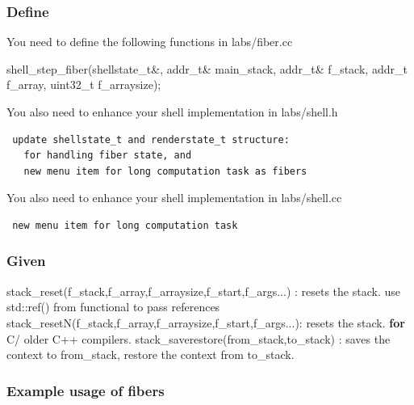 \documentclass[]{book}
\newenvironment{Shaded}{}{}
\newcommand{\KeywordTok}[1]{\textbf{{#1}}}
\newcommand{\DataTypeTok}[1]{\textcolor[rgb]{0.50,0.00,0.00}{{#1}}}
\newcommand{\NormalTok}[1]{{#1}}
\begin{document}
\subsubsection*{Define}\label{define-5}

You need to define the following functions in labs/fiber.cc

\begin{Shaded}
\begin{Highlighting}[]
   \NormalTok{shell_step_fiber(shellstate_t&, addr_t& main_stack, addr_t& f_stack, addr_t f_array, }\DataTypeTok{uint32_t} \NormalTok{f_arraysize);}
\end{Highlighting}
\end{Shaded}

You also need to enhance your shell implementation in labs/shell.h

\begin{verbatim}
 update shellstate_t and renderstate_t structure:
   for handling fiber state, and
   new menu item for long computation task as fibers
\end{verbatim}

You also need to enhance your shell implementation in labs/shell.cc

\begin{verbatim}
 new menu item for long computation task
\end{verbatim}

\subsubsection*{Given}\label{given-5}

\begin{Shaded}
\begin{Highlighting}[]
        \NormalTok{stack_reset(f_stack,f_array,f_arraysize,f_start,f_args...) : resets the stack. use std::ref() from functional to pass references}
        \NormalTok{stack_resetN(f_stack,f_array,f_arraysize,f_start,f_args...): resets the stack. }\KeywordTok{for} \NormalTok{C/ older C++ compilers.}
        \NormalTok{stack_saverestore(from_stack,to_stack)                     : saves the context to from_stack, restore the context from to_stack.}
\end{Highlighting}
\end{Shaded}

\subsubsection*{Example usage of fibers}\label{example-usage-of-fibers}
\end{document}

